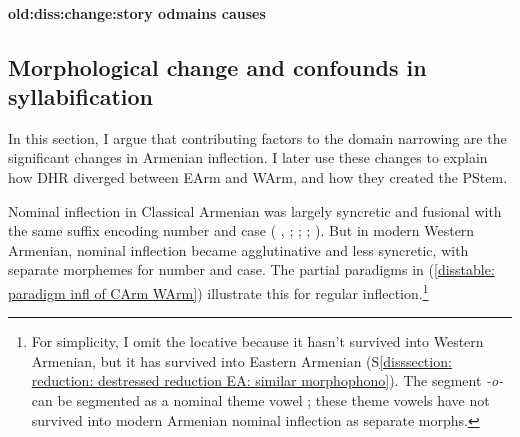 \paragraph{old:diss:change:story odmains causes}
\subsection{Morphological change   and confounds in syllabification}\label{disssection: reduction: history of reduction in classical: change}

In this section, I argue  that   contributing factors to the domain narrowing    are the significant changes in Armenian inflection. I later use these  changes  to explain  how DHR diverged between EArm and WArm, and how they created the PStem.%


Nominal inflection in Classical Armenian was largely syncretic and fusional with the same suffix encoding  number and case (\citeauthor{Adjarian-1909-ClassificationArmenianDialect} \citeyear[5]{Adjarian-1909-ClassificationArmenianDialect}, \citeauthor{HalleVaux-1998-IndoEuroNominalInflLatinArm} \citeyear[15]{HalleVaux-1998-IndoEuroNominalInflLatinArm}; \citealt{Donabedian-2000-ArmenianChangeClassicalModernTypology}; \citealt{Caha-2013-CaseNanosyntax};  \citeauthor{SayeedVaux-2017-EvolutionArmenian} \citeyear[1154]{SayeedVaux-2017-EvolutionArmenian}). But in modern  Western  Armenian, nominal inflection   became  agglutinative and less syncretic, with separate morphemes for number and case.  The partial paradigms in (\ref{disstable: paradigm infl of CArm WArm}) illustrate this  for regular inflection.\footnote{ For simplicity, I omit the locative because it hasn't survived into Western Armenian, but it has survived into Eastern Armenian (S\ref{disssection: reduction: destressed reduction EA: similar morphophono}). The segment \textit{-o-} can be segmented as a nominal theme vowel \citep{HalleVaux-1998-IndoEuroNominalInflLatinArm};   these theme vowels have not survived  into modern Armenian nominal inflection as separate morphs.} %




